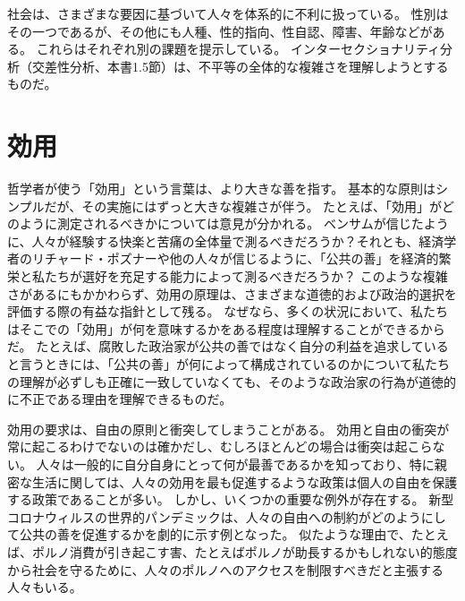 \documentclass[paper=a4,book,openany]{jlreq}
\begin{document}
社会は、さまざまな要因に基づいて人々を体系的に不利に扱っている。
性別はその一つであるが、その他にも人種、性的指向、性自認、障害、年齢などがある。
これらはそれぞれ別の課題を提示している。
インターセクショナリティ分析（交差性分析、本書1.5節）は、不平等の全体的な複雑さを理解しようとするものだ。

\section{効用}

哲学者が使う「効用」という言葉は、より大きな善を指す。
基本的な原則はシンプルだが、その実施にはずっと大きな複雑さが伴う。
たとえば、「効用」がどのように測定されるべきかについては意見が分かれる。
ベンサムが信じたように、人々が経験する快楽と苦痛の全体量で測るべきだろうか？それとも、経済学者のリチャード・ポズナーや他の人々が信じるように、「公共の善」を経済的繁栄と私たちが選好を充足する能力によって測るべきだろうか？ このような複雑さがあるにもかかわらず、効用の原理は、さまざまな道徳的および政治的選択を評価する際の有益な指針として残る。
なぜなら、多くの状況において、私たちはそこでの「効用」が何を意味するかをある程度は理解することができるからだ。
たとえば、腐敗した政治家が公共の善ではなく自分の利益を追求していると言うときには、「公共の善」が何によって構成されているのかについて私たちの理解が必ずしも正確に一致していなくても、そのような政治家の行為が道徳的に不正である理由を理解できるものだ。

効用の要求は、自由の原則と衝突してしまうことがある。
効用と自由の衝突が常に起こるわけでないのは確かだし、むしろほとんどの場合は衝突は起こらない。
人々は一般的に自分自身にとって何が最善であるかを知っており、特に親密な生活に関しては、人々の効用を最も促進するような政策は個人の自由を保護する政策であることが多い。
しかし、いくつかの重要な例外が存在する。
新型コロナウィルスの世界的パンデミックは、人々の自由への制約がどのようにして公共の善を促進するかを劇的に示す例となった。
似たような理由で、たとえば、ポルノ消費が引き起こす害、たとえばポルノが助長するかもしれない的態度から社会を守るために、人々のポルノへのアクセスを制限すべきだと主張する人々もいる。
\end{document}
